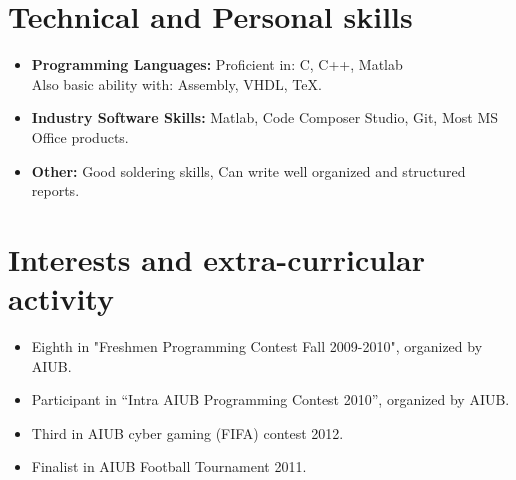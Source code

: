 \documentclass[11pt,a4paper,sans]{moderncv}        %
\begin{document}
\section{Technical and Personal skills}

\vspace{2pt}

\begin{itemize}

\item \textbf{Programming Languages:} Proficient in: C, C++, Matlab \\ Also basic ability with: Assembly, VHDL, TeX.

\vspace{2pt}

\item \textbf{Industry Software Skills:} Matlab, Code Composer Studio, Git, Most MS Office products.

\vspace{2pt}



\item \textbf{Other:} Good soldering skills, Can write well organized and structured reports.

\end{itemize}

\section{Interests and extra-curricular activity}

\vspace{2pt}

\begin{itemize}

\item{Eighth in "Freshmen Programming Contest Fall 2009-2010", organized by AIUB.}

\vspace{2pt}

\item{Participant in “Intra AIUB Programming Contest 2010”, organized by AIUB.}

\vspace{2pt}

\item{Third in AIUB cyber gaming (FIFA) contest 2012.}

\vspace{2pt}

\item{Finalist in AIUB Football Tournament 2011.}

\end{itemize}
\end{document}
